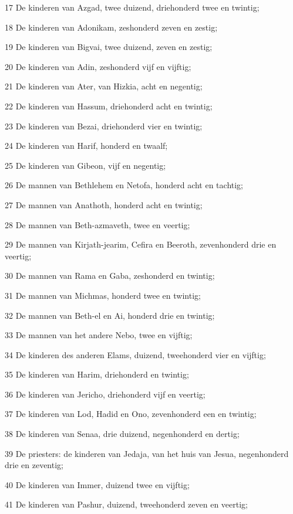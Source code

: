 \par 17 De kinderen van Azgad, twee duizend, driehonderd twee en twintig;
\par 18 De kinderen van Adonikam, zeshonderd zeven en zestig;
\par 19 De kinderen van Bigvai, twee duizend, zeven en zestig;
\par 20 De kinderen van Adin, zeshonderd vijf en vijftig;
\par 21 De kinderen van Ater, van Hizkia, acht en negentig;
\par 22 De kinderen van Hassum, driehonderd acht en twintig;
\par 23 De kinderen van Bezai, driehonderd vier en twintig;
\par 24 De kinderen van Harif, honderd en twaalf;
\par 25 De kinderen van Gibeon, vijf en negentig;
\par 26 De mannen van Bethlehem en Netofa, honderd acht en tachtig;
\par 27 De mannen van Anathoth, honderd acht en twintig;
\par 28 De mannen van Beth-azmaveth, twee en veertig;
\par 29 De mannen van Kirjath-jearim, Cefira en Beeroth, zevenhonderd drie en veertig;
\par 30 De mannen van Rama en Gaba, zeshonderd en twintig;
\par 31 De mannen van Michmas, honderd twee en twintig;
\par 32 De mannen van Beth-el en Ai, honderd drie en twintig;
\par 33 De mannen van het andere Nebo, twee en vijftig;
\par 34 De kinderen des anderen Elams, duizend, tweehonderd vier en vijftig;
\par 35 De kinderen van Harim, driehonderd en twintig;
\par 36 De kinderen van Jericho, driehonderd vijf en veertig;
\par 37 De kinderen van Lod, Hadid en Ono, zevenhonderd een en twintig;
\par 38 De kinderen van Senaa, drie duizend, negenhonderd en dertig;
\par 39 De priesters: de kinderen van Jedaja, van het huis van Jesua, negenhonderd drie en zeventig;
\par 40 De kinderen van Immer, duizend twee en vijftig;
\par 41 De kinderen van Pashur, duizend, tweehonderd zeven en veertig;
